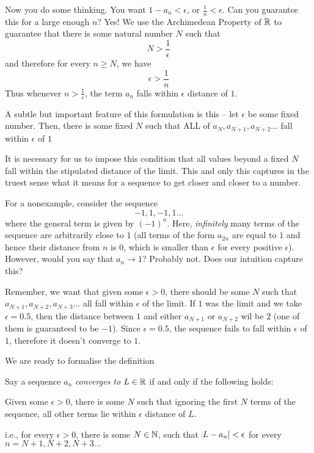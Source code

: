 Now you do some thinking. You want $1 - a_n < \epsilon$, or $\frac 1 n < \epsilon$. Can you guarantee this for a large enough $n$? Yes! We use the Archimedean Property of $\mathbb{R}$ to guarantee that there is some natural number $N$ such that
$$
N > \dfrac 1 \epsilon
$$
and therefore for every $n \geq N$, we have
$$
\epsilon > \dfrac 1 n
$$
Thus whenever $n > \frac{1}{\epsilon}$, the term $a_n$ falls within $\epsilon$ distance of $1$.

A subtle but important feature of this formulation is this -- let $\epsilon$ be some fixed number. Then, there is some fixed $N$ such that ALL of $a_N, a_{N + 1}, a_{N + 2} \dots$ fall within $\epsilon$ of $1$

It is necessary for us to impose this condition that all values beyond a fixed $N$ fall within the stipulated distance of the limit. This and only this captures in the truest sense what it means for a sequence to get closer and closer to a number.

For a nonexample, consider the sequence
$$
-1, 1, -1, 1 \dots
$$
where the general term is given by $(-1)^n$. Here, \emph{infinitely} many terms of the sequence are arbitrarily close to $1$ (all terms of the form $a_{2n}$ are equal to $1$ and hence their distance from $n$ is $0$, which is smaller than $\epsilon$ for every positive $\epsilon$). However, would you say that $a_n \rightarrow 1$? Probably not. Does our intuition capture this?

Remember, we want that given some $\epsilon > 0$, there should be some $N$ such that $a_{N + 1}, a_{N + 2}, a_{N + 3} \dots$ all fall within $\epsilon$ of the limit. If $1$ was the limit and we take $\epsilon = 0.5$, then the distance between $1$ and either $a_{N + 1}$ or $a_{N + 2}$ wil be $2$ (one of them is guaranteed to be $-1$). Since $\epsilon = 0.5$, the sequence fails to fall within $\epsilon$ of $1$, therefore it doesn't converge to $1$.

We are ready to formalise the definition
\begin{SNP}{\dfn}
{
	Say a sequence $a_n$ \emph{converges to} $L \in \mathbb{R}$ if and only if the following holds:

	Given some $\epsilon > 0$, there is some $N$ such that ignoring the first $N$ terms of the sequence, all other terms lie within $\epsilon$ distance of $L$.

	i.e., for every $\epsilon > 0$, there is some $N \in \mathbb{N}$, such that $\abs{L - a_n} < \epsilon$ for every $n = N + 1, N + 2, N + 3 \dots$
}
\end{SNP}
